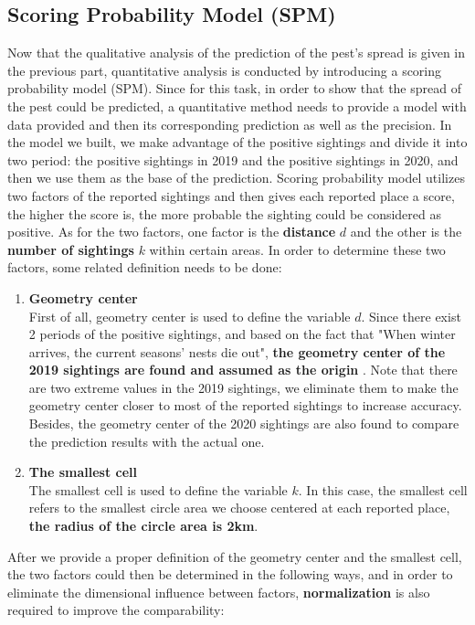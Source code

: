 \documentclass{mcmthesis}
\begin{document}
	\subsection{Scoring Probability Model (SPM)}
	\quad Now that the qualitative analysis of the prediction of the pest's spread is given in the previous part, quantitative analysis is conducted by introducing a scoring probability model (SPM). Since for this task, in order to show that the spread of the pest could be predicted, a quantitative method needs to provide a model with data provided and then its corresponding prediction as well as the precision. In the model we built, we make advantage of the positive sightings and divide it into two period: the positive sightings in 2019 and the positive sightings in 2020, and then we use them as the base of the prediction. Scoring probability model utilizes two factors of the reported sightings and then gives each reported place a score, the higher the score is, the more probable the sighting could be considered as positive. As for the two factors, one factor is the \textbf{distance} $d$ and the other is the \textbf{number of sightings} $k$ within certain areas. In order to determine these two factors, some related definition needs to be done: 
	\begin{enumerate}
		\item \textbf{Geometry center}\\
		First of all, geometry center is used to define the variable $d$. Since there exist 2 periods of the positive sightings, and based on the fact that "When winter arrives, the current seasons' nests die out", \textbf{the geometry center of the 2019 sightings are found and assumed as the origin} \cite{intro0}. Note that there are two extreme values in the 2019 sightings, we eliminate them to make the geometry center closer to most of the reported sightings to increase accuracy. Besides, the geometry center of the 2020 sightings are also found to compare the prediction results with the actual one.
		\item \textbf{The smallest cell}\\
		The smallest cell is used to define the variable $k$. In this case, the smallest cell refers to the smallest circle area we choose centered at each reported place, \textbf{the radius of the circle area is 2km}.	
	\end{enumerate}
	After we provide a proper definition of the geometry center and the smallest cell, the two factors could then be determined in the following ways, and in order to eliminate the dimensional influence between factors, \textbf{normalization} is also required to improve the comparability:
\end{document}
